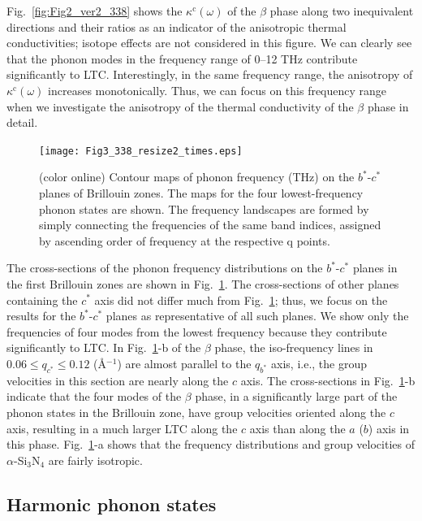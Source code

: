 \documentclass[twocolumn,amsmath,amssymb,a4paper,prb,superscriptaddress,floatfix]{revtex4-1}
\begin{document}
Fig.~\ref{fig:Fig2_ver2_338} shows the $\kappa^\text{c}(\omega)$ of the
$\beta$ phase along two inequivalent directions and their ratios as an
indicator of the anisotropic thermal conductivities; isotope effects are
not considered in this figure. We can clearly see that the phonon modes
in the frequency range of 0–12 THz contribute significantly to
LTC. Interestingly, in the same frequency range, the anisotropy of
$\kappa^\text{c}(\omega)$ increases monotonically. Thus, we can focus on
this frequency range when we investigate the anisotropy of the thermal
conductivity of the $\beta$ phase in detail.

\begin{figure}[ht]
 \begin{center}
  \texttt{[image: Fig3\_338\_resize2\_times.eps]} \caption{(color
  online) Contour maps of phonon frequency (THz) on the $b^*$-$c^*$
  planes of Brillouin zones. The maps for the four lowest-frequency
  phonon states are shown. The frequency landscapes are formed by simply
  connecting the frequencies of the same band indices, assigned by
  ascending order of frequency at the respective q
  points. \label{fig:Fig3_338} }
 \end{center}
\end{figure}

The cross-sections of the phonon frequency distributions on the
$b^*$-$c^*$ planes in the first Brillouin zones are shown in
Fig.~\ref{fig:Fig3_338}. The cross-sections of other planes containing
the $c^*$ axis did not differ much from Fig.~\ref{fig:Fig3_338}; thus,
we focus on the results for the $b^*$-$c^*$ planes as representative of
all such planes. We show only the frequencies of four modes from the
lowest frequency because they contribute significantly to LTC. In
Fig.~\ref{fig:Fig3_338}-b of the $\beta$ phase, the iso-frequency lines
in $0.06 \le q_{c^*} \le 0.12$ (\AA$^{-1}$) are almost parallel to the
$q_{b^*}$ axis, i.e., the group velocities in this section are nearly
along the $c$ axis. The cross-sections in Fig.~\ref{fig:Fig3_338}-b
indicate that the four modes of the $\beta$ phase, in a significantly
large part of the phonon states in the Brillouin zone, have group
velocities oriented along the $c$ axis, resulting in a much larger LTC
along the $c$ axis than along the $a$ ($b$) axis in this
phase. Fig.~\ref{fig:Fig3_338}-a shows that the frequency distributions
and group velocities of $\alpha$-Si$_3$N$_4$ are fairly isotropic.

\subsection{Harmonic phonon states}
\end{document}
